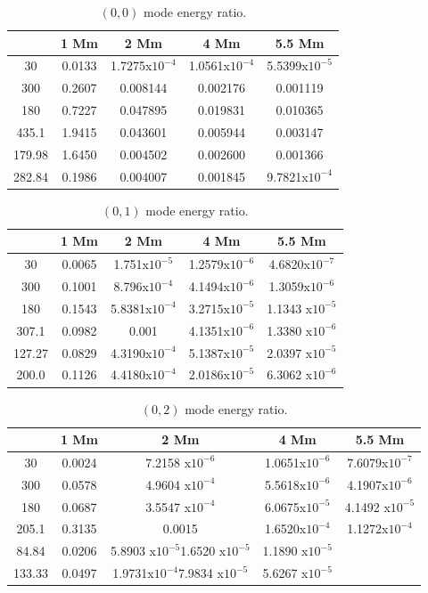 \documentclass[authoryear,final,1p]{elsarticle}
\begin{document}
\begin{table}
\centering
\begin{tabular}{c c c c c }
\hline
   &  1 Mm & 2 Mm & 4 Mm & 5.5 Mm \\
\hline
30 &  0.0133 & 1.7275x$10^{-4}$ & 1.0561x$10^{-4}$ & 5.5399x$10^{-5}$ \\
\hline
300 & 0.2607 & 0.008144 & 0.002176 &  0.001119 \\
\hline
180 & 0.7227 & 0.047895 & 0.019831 &  0.010365 \\
\hline
435.1 & 1.9415 & 0.043601 & 0.005944 & 0.003147  \\
\hline
179.98 & 1.6450 & 0.004502 & 0.002600&  0.001366 \\ 
\hline
282.84 & 0.1986 & 0.004007 & 0.001845 &  9.7821x$10^{-4}$ \\
\hline
\end{tabular} 
\caption{ $(0, 0)$ mode energy ratio.}
\end{table}

\begin{table}
\centering
\begin{tabular}{c c c c c }
\hline
   &  1 Mm & 2 Mm & 4 Mm & 5.5 Mm \\
\hline
30 &  0.0065 & 1.751x$10^{-5}$ &  1.2579x$10^{-6}$ & 4.6820x$10^{-7}$ \\
\hline
300 & 0.1001 & 8.796x$10^{-4}$ &  4.1494x$10^{-6}$ &  1.3059x$10^{-6}$ \\
\hline
180 & 0.1543 &  5.8381x$10^{-4}$ &  3.2715x$10^{-5}$ &  1.1343 x$10^{-5}$ \\
\hline
307.1 & 0.0982 & 0.001 & 4.1351x$10^{-6}$ & 1.3380 x$10^{-6}$  \\
\hline
127.27 & 0.0829 &  4.3190x$10^{-4}$ &  5.1387x$10^{-5}$ & 2.0397 x$10^{-5}$ \\ 
\hline
200.0 & 0.1126 &  4.4180x$10^{-4}$ &  2.0186x$10^{-5}$ & 6.3062 x$10^{-6}$ \\
\hline
\end{tabular} 
\caption{ $(0, 1)$ mode energy ratio.}
\end{table}

\begin{table}
\centering
\begin{tabular}{c c c c c }
\hline
   &  1 Mm & 2 Mm & 4 Mm & 5.5 Mm \\
\hline
30 &  0.0024 & 7.2158 x$10^{-6}$ & 1.0651x$10^{-6}$ & 7.6079x$10^{-7}$\\
\hline
300 & 0.0578 & 4.9604 x$10^{-4}$ & 5.5618x$10^{-6}$ & 4.1907x$10^{-6}$\\
\hline
180 & 0.0687 & 3.5547 x$10^{-4}$ & 6.0675x$10^{-5}$ & 4.1492 x$10^{-5}$\\
\hline
205.1 & 0.3135 & 0.0015 &1.6520x$10^{-4}$ & 1.1272x$10^{-4}$\\
\hline
84.84 & 0.0206 &5.8903 x$10^{-5}$1.6520 x$10^{-5}$ & 1.1890 x$10^{-5}$\\
\hline
133.33 & 0.0497 & 1.9731x$10^{-4}$7.9834 x$10^{-5}$ & 5.6267 x$10^{-5}$\\
\hline
\end{tabular} 
\caption{ $(0, 2)$ mode energy ratio.}
\end{table}
\end{document}
